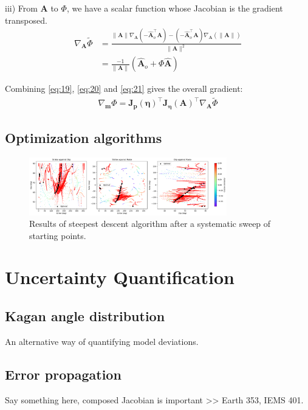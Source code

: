 \documentclass[preprint]{seismica}
\begin{document}
    iii) From $\bm{A}$ to $\Phi$, we have a scalar function whose Jacobian is the gradient
    transposed.
    \begin{align} \label{eq:21}
      \nonumber\nabla_{\bm{A}}\tilde{\Phi} &= \frac{\|\bm{A}\|\nabla_{\bm{A}}(-\hat{\bm{A}}_o^\top\bm{A}) - 
      (-\hat{\bm{A}}_o^\top \bm{A}) \nabla_{\bm{A}}(\|\bm{A}\|)}{\|\bm{A}\|^2}\\
            &= \frac{-1}{\|\bm{A}\|}(\hat{\bm{A}}_o + \Phi\hat{\bm{A}})
    \end{align}

    Combining \ref{eq:19}, \ref{eq:20} and \ref{eq:21} gives the overall gradient:
    \begin{align} \label{eq:22}
      \nabla_{\bm{m}}\Phi = \bm{J_p}(\bm{\eta})^\top \bm{J_\eta}(\bm{A})^\top \nabla_{\bm{A}}\tilde{\Phi}
    \end{align}

  \subsection{Optimization algorithms}
    \begin{figure}[ht!]
      \includegraphics[width=8.6cm]{seed_2024} 
      \caption{Results of steepest descent algorithm after a systematic sweep of starting points.}
      \label{fig:2}
    \end{figure}


\section{Uncertainty Quantification} \label{sec:uncertainty}

    \subsection{Kagan angle distribution}
      An alternative way of quantifying model deviations.

    \subsection{Error propagation}
      Say something here, composed Jacobian is important >> Earth 353, IEMS 401.
\end{document}
